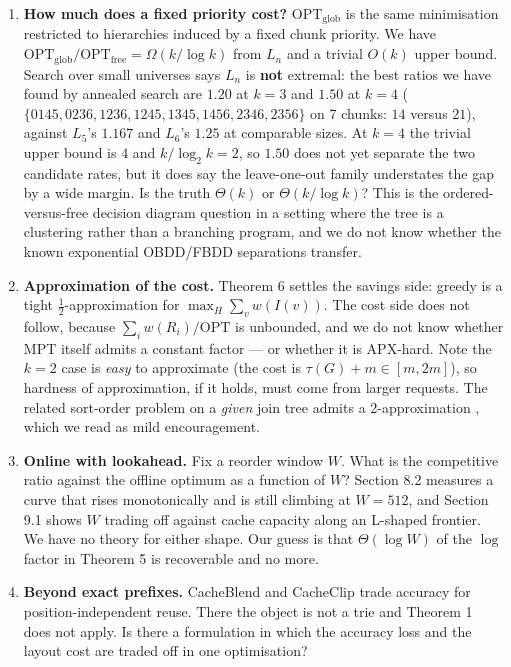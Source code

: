 \documentclass[11pt]{article}
\theoremstyle{plain}
\begin{document}
\begin{enumerate}
\item \textbf{How much does a fixed priority cost?} $\mathrm{OPT}_{\mathrm{glob}}$ is the same minimisation restricted to hierarchies induced by a fixed chunk priority. We have $\mathrm{OPT}_{\mathrm{glob}}/\mathrm{OPT}_{\mathrm{free}} = \Omega(k/\log k)$ from $L_n$ and a trivial $O(k)$ upper bound. Search over small universes says $L_n$ is \textbf{not} extremal: the best ratios we have found by annealed search are $1.20$ at $k=3$ and $\mathbf{1.50}$ at $k=4$ ($\{0145,0236,1236,1245,1345,1456,2346,2356\}$ on 7 chunks: $14$ versus $21$), against $L_5$'s $1.167$ and $L_6$'s $1.25$ at comparable sizes. At $k=4$ the trivial upper bound is $4$ and $k/\log_2 k = 2$, so $1.50$ does not yet separate the two candidate rates, but it does say the leave-one-out family understates the gap by a wide margin. Is the truth $\Theta(k)$ or $\Theta(k/\log k)$? This is the ordered-versus-free decision diagram question in a setting where the tree is a clustering rather than a branching program, and we do not know whether the known exponential OBDD/FBDD separations transfer.
\item \textbf{Approximation of the cost.} Theorem 6 settles the savings side: greedy is a tight $\tfrac12$-approximation for $\max_H \sum_v w(I(v))$. The cost side does not follow, because $\sum_i w(R_i)/\mathrm{OPT}$ is unbounded, and we do not know whether MPT itself admits a constant factor --- or whether it is APX-hard. Note the $k=2$ case is \emph{easy} to approximate (the cost is $\tau(G)+m \in [m,2m]$), so hardness of approximation, if it holds, must come from larger requests. The related sort-order problem on a \emph{given} join tree admits a 2-approximation \cite{GSD06}, which we read as mild encouragement.
\item \textbf{Online with lookahead.} Fix a reorder window $W$. What is the competitive ratio against the offline optimum as a function of $W$? Section 8.2 measures a curve that rises monotonically and is still climbing at $W = 512$, and Section 9.1 shows $W$ trading off against cache capacity along an L-shaped frontier. We have no theory for either shape. Our guess is that $\Theta(\log W)$ of the $\log$ factor in Theorem 5 is recoverable and no more.
\item \textbf{Beyond exact prefixes.} CacheBlend \cite{CB24} and CacheClip \cite{CC25} trade accuracy for position-independent reuse. There the object is not a trie and Theorem 1 does not apply. Is there a formulation in which the accuracy loss and the layout cost are traded off in one optimisation?
\end{enumerate}
\end{document}

